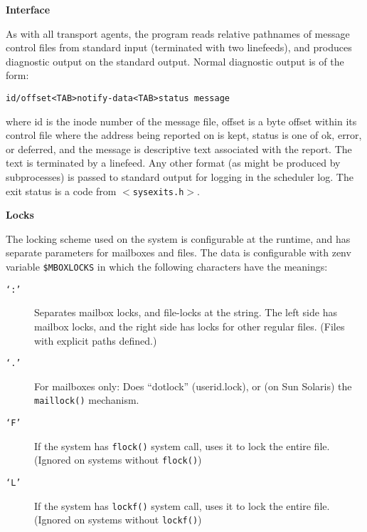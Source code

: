 {\bf Interface}

As with all transport agents, the program reads relative
pathnames of message control files from  standard input 
(terminated with two linefeeds), and produces diagnostic output on the
standard output. Normal diagnostic output is of the form:

\begin{verbatim}
id/offset<TAB>notify-data<TAB>status message
\end{verbatim}


where id is the inode number of the message file, offset is a
byte offset within its control file where the address being
reported on is kept, status is one of ok, error, or deferred, and
the message is descriptive text associated with the report. The
text is terminated by a linefeed. Any other format (as might be
produced by subprocesses) is passed to standard output for 
logging in the scheduler log.
The exit status is a code from {\tt {\(<\)}sysexits.h{\(>\)}}.

{\bf Locks}

The locking scheme used on the system is configurable at the
runtime, and has separate parameters for mailboxes and files.
The data is configurable with zenv variable {\tt \$MBOXLOCKS} in which
the following characters have the meanings:

\begin{description}
\item[{\tt `:'}] \mbox{}

Separates mailbox locks, and file-locks at the string. The left
side has mailbox locks, and the right side has locks for other
regular files. (Files with explicit paths defined.)

\item[{\tt `.'}] \mbox{}

For mailboxes only: Does ``dotlock'' (userid.lock), or (on Sun
Solaris) the {\tt maillock()} mechanism.

\item[{\tt `F'}] \mbox{}

If the system has {\tt flock()} system call, uses it to lock 
the entire file. (Ignored on systems without {\tt flock()})

\item[{\tt `L'}] \mbox{}

If the system has {\tt lockf()} system call, uses it to lock 
the entire file. (Ignored on systems without {\tt lockf()}) 

\end{description}


